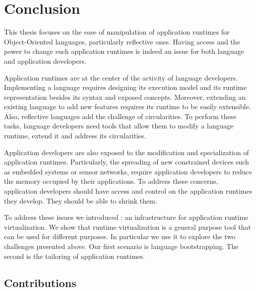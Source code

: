 
\chapter{Conclusion}
\minitoc
\introduction

This thesis focuses on the ease of manipulation of application runtimes for Object-Oriented languages, particularly reflective ones. Having access and the power to change such application runtimes is indeed an issue for both language and application developers.

Application runtimes are at the center of the activity of language developers. Implementing a language requires designing its execution model and its runtime representation besides its syntax and exposed concepts. Moreover, extending an existing language to add new features requires its runtime to be easily extensible. Also, reflective languages add the challenge of circularities. To perform these tasks, language developers need tools that allow them to modify a language runtime, extend it and address its circularities.

Application developers are also exposed to the modification and specialization of application runtimes. Particularly, the spreading of new constrained devices such as embedded systems or sensor networks, require application developers to reduce the memory occupied by their applications. To address these concerns, application developers should have access and control on the application runtimes they develop. They should be able to shrink them.

To address these issues we introduced \Vtt: an infrastructure for application runtime virtualization. We show that runtime virtualization is a general purpose tool that can be used for different purposes. In particular we use it to explore the two challenges presented above. Our first scenario is language bootstrapping. The second is the tailoring of application runtimes.

\section{Contributions}

